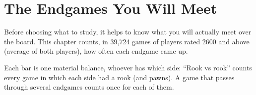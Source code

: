 \chapter{The Endgames You Will Meet}\label{ch:meet}
Before choosing what to study, it helps to know what you will actually meet over the board. This chapter counts, in 39,724 games of players rated 2600 and above (average of both players), how often each endgame came up.

Each bar is one material balance, whoever has which side: “Rook vs rook” counts every game in which each side had a rook (and pawns). A game that passes through several endgames counts once for each of them.

